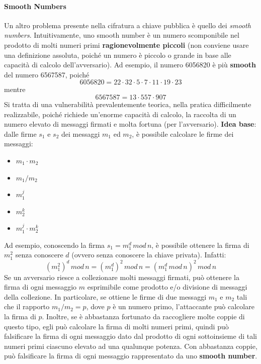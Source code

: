 \paragraph{Smooth Numbers}
Un altro problema presente nella cifratura a chiave pubblica è quello dei \textit{smooth numbers}. Intuitivamente, uno smooth number è un numero scomponibile nel prodotto di molti numeri primi \textbf{ragionevolmente piccoli} (non conviene usare una definizione assoluta, poiché un numero è piccolo o grande in base alle capacità di calcolo dell'avversario). Ad esempio, il numero 6056820 è più \textbf{smooth} del numero 6567587, poiché 
\begin{equation}
6056820 = 22 \cdot 32 \cdot 5 \cdot 7 \cdot 11 \cdot 19 \cdot 23
\end{equation}
mentre
\begin{equation}
6567587 = 13 \cdot 557 \cdot 907
\end{equation}
Si tratta di una vulnerabilità prevalentemente teorica, nella pratica difficilmente realizzabile, poiché richiede un'enorme capacità di calcolo, la raccolta di un numero elevato di messaggi firmati e molta fortuna (per l'avversario). 
\newline \newline
\textbf{Idea base}: dalle firme $s_{1}$ e $s_{2}$ dei messaggi $m_{1}$ ed $m_{2}$, è possibile calcolare le firme dei messaggi:
\begin{itemize}
\item $m_{1} \cdot m_{2}$
\item $m_{1}/m_{2}$
\item $m_{1}^j$
\item $m_{2}^k$ 
\item $m_{1}^j \cdot m_{2}^k$
\end{itemize} 
Ad esempio, conoscendo la firma $s_{1} = m_{1}^d \, mod \, n $, è possibile ottenere la firma di $m_{1}^2$ senza conoscere $d$ (ovvero senza conoscere la chiave privata). Infatti:
\begin{equation}
(m_{1}^2)^d \, mod \, n = (m_{1}^d)^2 \, mod \, n = (m_{1}^d \, mod \, n)^2 \, mod \, n
\end{equation} 
Se un avversario riesce a collezionare molti messaggi firmati, può ottenere la firma di ogni messaggio $m$ esprimibile come prodotto e/o divisione di messaggi della collezione. In particolare, se ottiene le firme di due messaggi $m_{1}$ e $m_{2}$ tali che il rapporto $m_{1}/m_{2}=p$, dove $p$ è un numero primo, l'attaccante può calcolare la firma di $p$. Inoltre, se è abbastanza fortunato da raccogliere molte coppie di questo tipo, egli può calcolare la firma di molti numeri primi, quindi può falsificare la firma di ogni messaggio dato dal prodotto di ogni sottoinsieme di tali numeri primi ciascuno elevato ad una qualunque potenza. Con abbastanza coppie, può falsificare la firma di ogni messaggio rappresentato da uno \textbf{smooth number}. 
